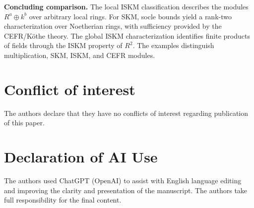 \documentclass[11pt,a4paper]{article}
\theoremstyle{definition}
\theoremstyle{remark}
\begin{document}
\noindent\textbf{Concluding comparison.}
The local ISKM classification describes the modules
$R^a\oplus k^b$ over arbitrary local rings.
For SKM, socle bounds yield a rank-two
characterization over Noetherian rings, with
sufficiency provided by the CEFR/K\"othe theory.
The global ISKM characterization identifies
finite products of fields through the ISKM
property of $R^2$. The examples distinguish
multiplication, SKM, ISKM, and CEFR modules.

\section*{Conflict of interest}

The authors declare that they have no conflicts of interest regarding
publication of this paper.

 \section*{Declaration of AI Use} 
The authors used ChatGPT (OpenAI) to assist with English language editing and improving the clarity and presentation of the manuscript. The authors take full responsibility for the final content.
\end{document}
